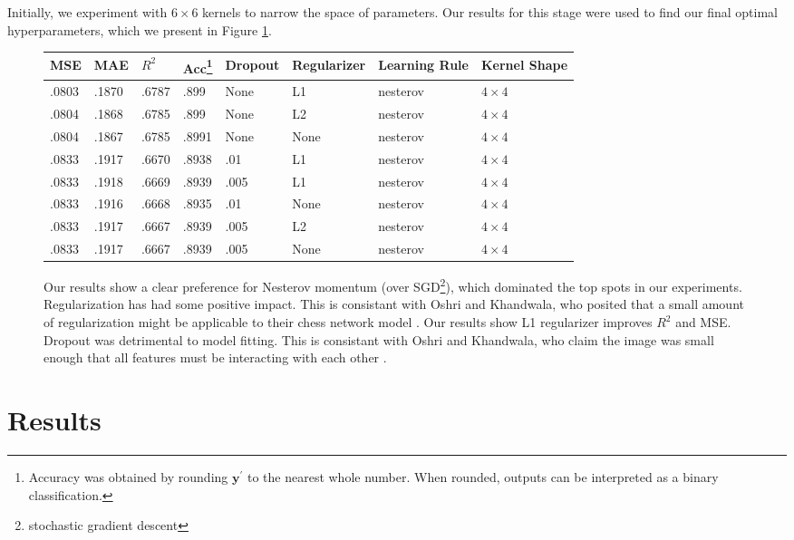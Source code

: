 \documentclass{article}
\begin{document}
Initially, we experiment with $6\times 6$ kernels to narrow the space of parameters.  Our results for this stage were used to find our final optimal hyperparameters, which we present in Figure \ref{fig:paramtable}.

\begin{figure}[ht]
\centering
\begin{tabular}{|l|l|l|l|l|l|l|l|}
\hline
\textbf{MSE} & \textbf{MAE} & \textbf{$R^2$} & \textbf{Acc\footnote{Accuracy was obtained by rounding $\textbf{y}^\prime$ to the nearest whole number.  When rounded, outputs can be interpreted as a binary classification.}} & \textbf{Dropout} & \textbf{Regularizer} & \textbf{Learning Rule} & \textbf{Kernel Shape} \\
\hline
.0803 & .1870 & .6787 & .899 & None & L1 & nesterov & $4\times 4$ \\
.0804 & .1868 & .6785 & .899 & None & L2 & nesterov & $4\times 4$ \\
.0804 & .1867 & .6785 & .8991 & None & None & nesterov & $4\times 4$ \\
.0833 & .1917 & .6670 & .8938 & .01 & L1 & nesterov & $4\times 4$ \\
.0833 & .1918 & .6669 & .8939 & .005 & L1 & nesterov & $4\times 4$ \\
.0833 & .1916 & .6668 & .8935 & .01 & None & nesterov & $4\times 4$ \\
.0833 & .1917 & .6667 & .8939 & .005 & L2 & nesterov & $4\times 4$ \\
.0833 & .1917 & .6667 & .8939 & .005 & None & nesterov & $4\times 4$ \\
\hline
\end{tabular}
\caption{Our results show a clear preference for Nesterov momentum (over SGD\footnote{stochastic gradient descent}), which dominated the top spots in our experiments.  Regularization has had some positive impact.  This is consistant with Oshri and Khandwala, who posited that a small amount of regularization might be applicable to their chess network model \cite{Oshri_Khandwala}. Our results show L1 regularizer improves $R^2$ and MSE.  Dropout was detrimental to model fitting.  This is consistant with Oshri and Khandwala, who claim the image was small enough that all features must be interacting with each other \cite{Oshri_Khandwala}. \label{fig:paramtable}}
\end{figure}

\section{Results}
\end{document}
